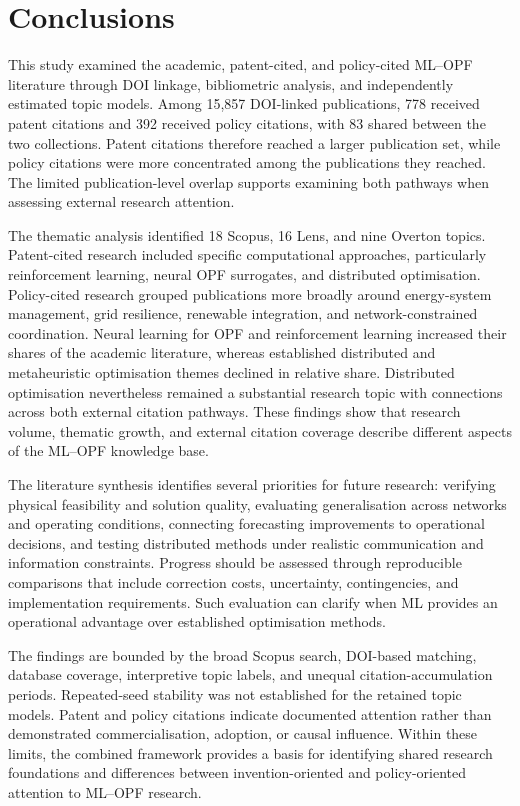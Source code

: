 \documentclass[a4paper,fleqn]{cas-sc}
\begin{document}
\section{Conclusions}\label{sec:conclusions}

This study examined the academic, patent-cited, and policy-cited ML--OPF literature through DOI linkage, bibliometric analysis, and independently estimated topic models. Among 15,857 DOI-linked publications, 778 received patent citations and 392 received policy citations, with 83 shared between the two collections. Patent citations therefore reached a larger publication set, while policy citations were more concentrated among the publications they reached. The limited publication-level overlap supports examining both pathways when assessing external research attention.

The thematic analysis identified 18 Scopus, 16 Lens, and nine Overton topics. Patent-cited research included specific computational approaches, particularly reinforcement learning, neural OPF surrogates, and distributed optimisation. Policy-cited research grouped publications more broadly around energy-system management, grid resilience, renewable integration, and network-constrained coordination. Neural learning for OPF and reinforcement learning increased their shares of the academic literature, whereas established distributed and metaheuristic optimisation themes declined in relative share. Distributed optimisation nevertheless remained a substantial research topic with connections across both external citation pathways. These findings show that research volume, thematic growth, and external citation coverage describe different aspects of the ML--OPF knowledge base.

The literature synthesis identifies several priorities for future research: verifying physical feasibility and solution quality, evaluating generalisation across networks and operating conditions, connecting forecasting improvements to operational decisions, and testing distributed methods under realistic communication and information constraints. Progress should be assessed through reproducible comparisons that include correction costs, uncertainty, contingencies, and implementation requirements. Such evaluation can clarify when ML provides an operational advantage over established optimisation methods.

The findings are bounded by the broad Scopus search, DOI-based matching, database coverage, interpretive topic labels, and unequal citation-accumulation periods. Repeated-seed stability was not established for the retained topic models. Patent and policy citations indicate documented attention rather than demonstrated commercialisation, adoption, or causal influence. Within these limits, the combined framework provides a basis for identifying shared research foundations and differences between invention-oriented and policy-oriented attention to ML--OPF research.
\end{document}
